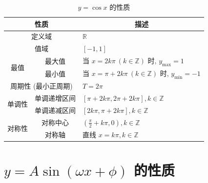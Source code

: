 \begin{table}[ht]
    \centering
    \caption{$y=\cos x$ 的性质}
    \renewcommand{\arraystretch}{1.5}
    \begin{tabular}{c|c|l}
        \toprule[1.5pt]
        \multicolumn{2}{c|}{\textbf{性质}} & \multicolumn{1}{c}{\textbf{描述}}                                                         \\
        \midrule
        \multicolumn{2}{c|}{定义域}         & $\mathbb{R}$                                                                            \\
        \midrule
        \multicolumn{2}{c|}{值域}          & $[-1,1]$                                                                                \\
        \midrule
        \multirow{2}{*}{最值}              & 最大值                             & 当 $x=2k\pi \ (k\in \mathbb{Z})$ 时, $y_{\max}=1$       \\
        \cmidrule{2-3}
                                         & 最小值                             & 当 $x=\pi+2k\pi \ (k\in \mathbb{Z})$ 时, $y_{\min}=-1$  \\
        \midrule
        \multicolumn{2}{c|}{周期性 (最小正周期)} & $T=2\pi$                                                                                \\
        \midrule
        \multirow{2}{*}{单调性}             & 单调递增区间                          & $\left[\pi+2k\pi, 2\pi+2k\pi\right], k\in \mathbb{Z}$ \\
        \cmidrule{2-3}
                                         & 单调递减区间                          & $\left[2k\pi, \pi+2k\pi\right], k\in \mathbb{Z}$      \\
        \midrule
        \multirow{2}{*}{对称性}             & 对称中心                            & $\left(\frac{\pi}{2}+k\pi, 0\right), k\in \mathbb{Z}$ \\
        \cmidrule{2-3}
                                         & 对称轴                             & 直线 $x=k\pi, k\in \mathbb{Z}$                          \\
        \bottomrule[1.5pt]
    \end{tabular}
\end{table}

\clearpage

\section{$y=A\sin(\omega x+\phi)$ 的性质}

